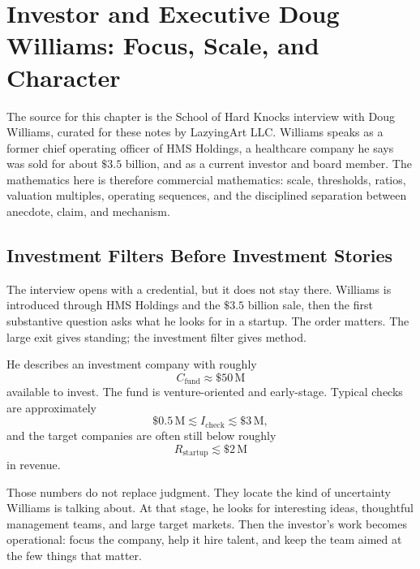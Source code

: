 \chapter{Investor and Executive Doug Williams: Focus, Scale, and Character}

The source for this chapter is the School of Hard Knocks interview with Doug Williams, curated for these notes by LazyingArt LLC. Williams speaks as a former chief operating officer of HMS Holdings, a healthcare company he says was sold for about \(\$3.5\) billion, and as a current investor and board member. The mathematics here is therefore commercial mathematics: scale, thresholds, ratios, valuation multiples, operating sequences, and the disciplined separation between anecdote, claim, and mechanism.

\section{Investment Filters Before Investment Stories}

The interview opens with a credential, but it does not stay there. Williams is introduced through HMS Holdings and the \(\$3.5\) billion sale, then the first substantive question asks what he looks for in a startup. The order matters. The large exit gives standing; the investment filter gives method.

He describes an investment company with roughly
\begin{equation}
C_{\mathrm{fund}} \approx \$50\,\mathrm{M}
\end{equation}
available to invest. The fund is venture-oriented and early-stage. Typical checks are approximately
\begin{equation}
\$0.5\,\mathrm{M} \lesssim I_{\mathrm{check}} \lesssim \$3\,\mathrm{M},
\end{equation}
and the target companies are often still below roughly
\begin{equation}
R_{\mathrm{startup}} \lesssim \$2\,\mathrm{M}
\end{equation}
in revenue.

Those numbers do not replace judgment. They locate the kind of uncertainty Williams is talking about. At that stage, he looks for interesting ideas, thoughtful management teams, and large target markets. Then the investor's work becomes operational: focus the company, help it hire talent, and keep the team aimed at the few things that matter.

